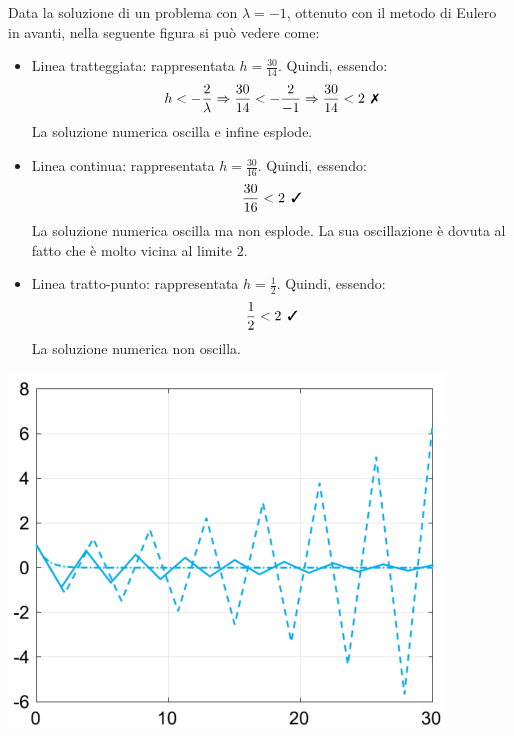 \begin{examplebox}
	Data la soluzione di un problema con $\lambda = -1$, ottenuto con il metodo di Eulero in avanti, nella seguente figura si può vedere come:
	\begin{itemize}
		\item Linea tratteggiata: rappresentata $h = \frac{30}{14}$. Quindi, essendo:
		\begin{equation*}
			h < -\dfrac{2}{\lambda} \Rightarrow \dfrac{30}{14} < -\dfrac{2}{-1} \Rightarrow \dfrac{30}{14} < 2 \:\: \text{\ding{55}}
		\end{equation*}
		La soluzione numerica oscilla e infine esplode.
		
		\item Linea continua: rappresentata $h = \frac{30}{16}$. Quindi, essendo:
		\begin{equation*}
			\dfrac{30}{16} < 2 \:\: \text{\ding{51}}
		\end{equation*}
		La soluzione numerica oscilla ma non esplode. La sua oscillazione è dovuta al fatto che è molto vicina al limite $2$.
		
		\item Linea tratto-punto: rappresentata $h = \frac{1}{2}$. Quindi, essendo:
		\begin{equation*}
			\dfrac{1}{2} < 2 \:\: \text{\ding{51}}
		\end{equation*}
		La soluzione numerica non oscilla.
	\end{itemize}
	\begin{center}
		\includegraphics[width=.6\textwidth]{img/metodo-di-eulero-1.png}
	\end{center}
\end{examplebox}

